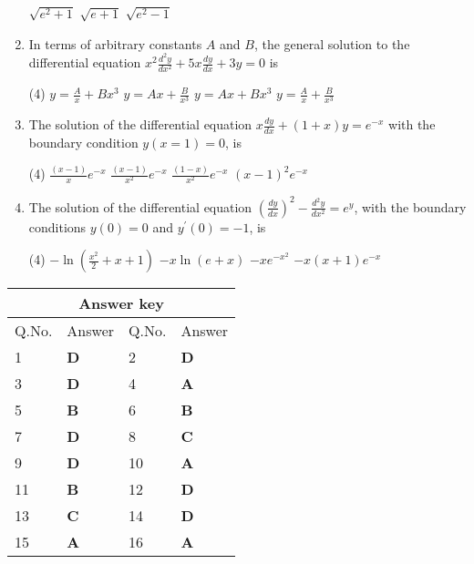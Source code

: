 \begin{enumerate}[label=\color{ocre}\textbf{\arabic*.}]
\begin{tasks}
		\task[\textbf{B.}] $\sqrt{e^{2}+1}$
		\task[\textbf{C.}]  $\sqrt{e+1}$
		\task[\textbf{D.}] $\sqrt{e^{2}-1}$
	\end{tasks}
	\item  In terms of arbitrary constants $A$ and $B$, the general solution to the differential equation $x^{2} \frac{d^{2} y}{d x^{2}}+5 x \frac{d y}{d x}+3 y=0$ is
	{}
	\begin{tasks}(4)
		\task[\textbf{A.}]  $y=\frac{A}{x}+B x^{3}$
		\task[\textbf{B.}] $y=A x+\frac{B}{x^{3}}$
		\task[\textbf{C.}] $y=A x+B x^{3}$
		\task[\textbf{D.}] $y=\frac{A}{x}+\frac{B}{x^{3}}$
	\end{tasks}
	\item The solution of the differential equation $x \frac{d y}{d x}+(1+x) y=e^{-x}$ with the boundary condition $y(x=1)=0$, is
	{}
	\begin{tasks}(4)
		\task[\textbf{A.}] $\frac{(x-1)}{x} e^{-x}$
		\task[\textbf{B.}] $\frac{(x-1)}{x^{2}} e^{-x}$
		\task[\textbf{C.}] $\frac{(1-x)}{x^{2}} e^{-x}$
		\task[\textbf{D.}] $(x-1)^{2} e^{-x}$
	\end{tasks}
	\item The solution of the differential equation $\left(\frac{d y}{d x}\right)^{2}-\frac{d^{2} y}{d x^{2}}=e^{y}$, with the boundary conditions $y(0)=0$ and $y^{\prime}(0)=-1$, is
	{}
	\begin{tasks}(4)
		\task[\textbf{A.}] $-\ln \left(\frac{x^{2}}{2}+x+1\right)$
		\task[\textbf{B.}] $-x \ln (e+x)$
		\task[\textbf{C.}] $-x e^{-x^{2}}$
		\task[\textbf{D.}]  $-x(x+1) e^{-x}$
	\end{tasks}
\end{enumerate}
\setlength\arrayrulewidth{1pt}
\begin{table}[H]
	\centering
	\begin{tabular}{|p{1.5cm}|p{1.5cm}||p{1.5cm}|p{1.5cm}|}
		\hline
		\multicolumn{4}{|c|}{\textbf{Answer key}}\\\hline\hline
		\rowcolor{ocrel}Q.No.&Answer&Q.No.&Answer\\\hline
		1&\textbf{D} &2&\textbf{D}\\\hline 
		3&\textbf{D} &4&\textbf{A} \\\hline
		5&\textbf{B} &6&\textbf{B} \\\hline
		7&\textbf{D}&8&\textbf{C}\\\hline
		9&\textbf{D}&10&\textbf{A}\\\hline
		11&\textbf{B} &12&\textbf{D}\\\hline
		13&\textbf{C}&14&\textbf{D}\\\hline
		15&\textbf{A}&16&\textbf{A} \\\hline
		
	\end{tabular}
\end{table}

